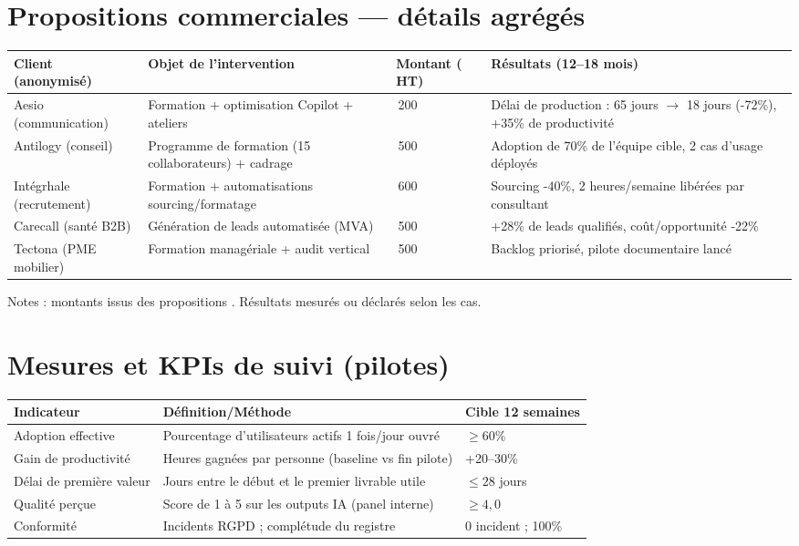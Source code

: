 \section{Propositions commerciales — détails agrégés}
\begin{longtable}{@{}>{\raggedright\arraybackslash}p{3.2cm}>{\raggedright\arraybackslash}p{5cm}>{\raggedright\arraybackslash}p{2.5cm}>{\raggedright\arraybackslash}p{4.5cm}@{}}
\toprule
\textbf{Client (anonymisé)} & \textbf{Objet de l'intervention} & \textbf{Montant (\texteuro{} HT)} & \textbf{Résultats (12–18 mois)} \\
\midrule
Aesio (communication) & Formation + optimisation Copilot + ateliers & 3\,200 & Délai de production : 65 jours $\rightarrow$ 18 jours (-72\%), +35\% de productivité \\
Antilogy (conseil) & Programme de formation (15 collaborateurs) + cadrage & 3\,500 & Adoption de 70\% de l'équipe cible, 2 cas d'usage déployés \\
Intégrhale (recrutement) & Formation + automatisations sourcing/formatage & 2\,600 & Sourcing -40\%, 2 heures/semaine libérées par consultant \\
Carecall (santé B2B) & Génération de leads automatisée (MVA) & 2\,500 & +28\% de leads qualifiés, coût/opportunité -22\% \\
Tectona (PME mobilier) & Formation managériale + audit vertical & 3\,500 & Backlog priorisé, pilote documentaire lancé \\
\bottomrule
\end{longtable}
Notes : montants issus des propositions \cite{luwai2025aesio, luwai2025antilogy, luwai2025integrhale, luwai2025carecall, luwai2025tectona}. Résultats mesurés ou déclarés selon les cas.

\section{Mesures et KPIs de suivi (pilotes)}
\begin{longtable}{@{}p{5.5cm}p{7.5cm}p{4cm}@{}}
\toprule
\textbf{Indicateur} & \textbf{Définition/Méthode} & \textbf{Cible 12 semaines} \\
\midrule
Adoption effective & Pourcentage d'utilisateurs actifs 1 fois/jour ouvré & $\geq 60\%$ \\
Gain de productivité & Heures gagnées par personne (baseline vs fin pilote) & +20–30\% \\
Délai de première valeur & Jours entre le début et le premier livrable utile & $\leq 28$ jours \\
Qualité perçue & Score de 1 à 5 sur les outputs IA (panel interne) & $\geq 4{,}0$ \\
Conformité & Incidents RGPD ; complétude du registre & 0 incident ; 100\% \\
\bottomrule
\end{longtable}

